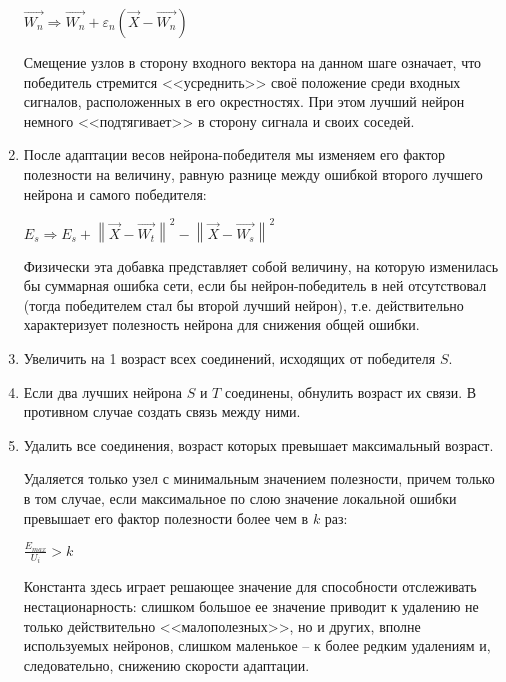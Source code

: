 \documentclass[unicode, 12pt, a4paper,oneside,fleqn]{article}
\begin{document}
\begin{enumerate}
  $\vec{W_n}\Rightarrow \vec{W_n}+\varepsilon_n(\vec{X}-\vec{W_n})$

  Смещение узлов в сторону входного вектора на данном шаге означает,
  что победитель стремится <<усреднить>> своё положение среди входных
  сигналов, расположенных в его окрестностях. При этом лучший нейрон
  немного <<подтягивает>> в сторону сигнала и своих соседей.

\item %
  После адаптации весов нейрона-победителя мы изменяем его фактор
  полезности на величину, равную разнице между ошибкой второго лучшего
  нейрона и самого победителя:

  $E_{s}\Rightarrow E_{s} + \left\|\vec{X}-\vec{W_t}\right\|^{2} -
                           \left\|\vec{X}-\vec{W_s}\right\|^{2}$

  Физически эта добавка представляет собой величину, на которую
  изменилась бы суммарная ошибка сети, если бы нейрон-победитель в ней
  отсутствовал (тогда победителем стал бы второй лучший нейрон),
  т.е. действительно характеризует полезность нейрона для снижения
  общей ошибки.

\item %
  Увеличить на 1 возраст всех соединений, исходящих от победителя $S$.

\item %
  Если два лучших нейрона $S$ и $T$ соединены, обнулить возраст их
  связи. В противном случае создать связь между ними.

\item %
  Удалить все соединения, возраст которых превышает максимальный
  возраст.


  Удаляется только узел с минимальным значением полезности, причем
  только в том случае, если максимальное по слою значение локальной
  ошибки превышает его фактор полезности более чем в $k$ раз:

  $\frac{E_{max}}{U_i} > k$

  Константа здесь играет решающее значение для способности отслеживать
  нестационарность: слишком большое ее значение приводит к удалению не
  только действительно <<малополезных>>, но и других, вполне
  используемых нейронов, слишком маленькое – к более редким удалениям
  и, следовательно, снижению скорости адаптации.


\end{enumerate}
\end{document}
